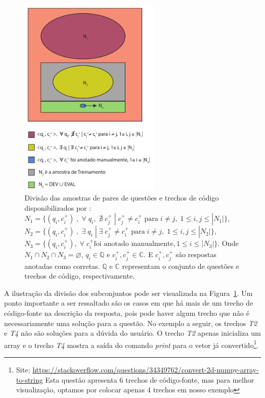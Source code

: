 \begin{figure}[H]
\centering
\includegraphics[width=0.6\textwidth]{figuras/cap-experimento/distinct-subsets-yao-sample.pdf}
\caption[Divisão das amostras de pares de questões e trechos de código.]{Divisão das amostras de pares de questões e trechos de código disponibilizados por \cite{yao-2018}: $N_{1} = \{(q_{i}, c_{i}^{+})\;,\; \forall\; q_{i},\;\nexists\; c_{j}^{+}\; |\; c_{j}^{+} \neq c_{i}^{+}\; \text{para}\; i \neq j,\; 1 \leq i,j \leq |N_{1}| \}$, $N_{2} = \{(q_{i}, c_{i}^{+})\;,\; \exists\; q_{i}\; | \;\exists\; c_{j}^{+} \neq c_{i}^{+}\; \text{para} \; i \neq j,\; 1 \leq i,j \leq |N_{2}| \}$, $N_{3} = \{(q_{i}, c_{i}^{+}),\; \forall\; c_{i}^{+} \text{foi anotado manualmente}, 1 \leq i \leq |N_{3}| \}$. Onde $N_{1} \cap N_{2} \cap N_{3} = \varnothing$, $q_{i} \in \mathbb{Q}$ e $c_{i}^{+},  c_{j}^{+} \in \mathbb{C}$. E $c_{i}^{+}, c_{j}^{+}$ são respostas anotadas como corretas. $\mathbb{Q}$ e $\mathbb{C}$ representam o conjunto de questões e trechos de código, respectivamente.} 
\label{fig:distinct-subset-python-pair-question-code}
\end{figure}

A ilustração da divisão dos subconjuntos pode ser visualizada na Figura~\ref{fig:distinct-subset-python-pair-question-code}. Um ponto importante a ser ressaltado são os casos em que há mais de um trecho de código-fonte na descrição da resposta, pois pode haver algum trecho que não é necessariamente uma solução para a questão. No exemplo a seguir, os trechos \emph{T2} e \emph{T4} não são soluções para a dúvida do usuário. O trecho \emph{T2} apenas inicializa um array e o trecho \emph{T4} mostra a saída do comando \textit{print} para o vetor já convertido\footnote{Site: \url{https://stackoverflow.com/questions/34349762/convert-2d-numpy-array-to-string} Esta questão apresenta 6 trechos de código-fonte, mas para melhor visualização, optamos por colocar apenas 4 trechos em nosso exemplo\label{foot:exemplo-stackoverflow-mais-de-um-trecho}}.



